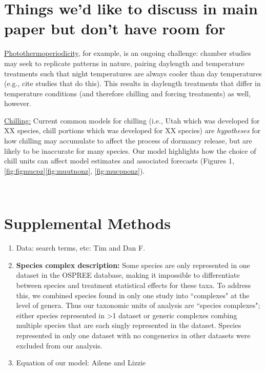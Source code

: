 \documentclass{article}
\begin{document}
\section*{Things we'd like to discuss in main paper but don't have room for}

\par \underline{Photothermoperiodicity}, for example, is an ongoing challenge: chamber studies may seek to replicate patterns in nature, pairing daylength and temperature treatments such that night temperatures are always cooler than day temperatures (e.g., cite studies that do this).  This results in daylength treatments that differ in temperature conditions (and therefore chilling and forcing treatments) as well, however.  

\par \underline{Chilling:} Current common models for chilling (i.e., Utah which was developed for XX species,  chill portions which was developed for XX species) are \emph{hypotheses} for how chilling may accumulate to affect the process of dormancy release, but are likely to be inaccurate for many species. Our model highlights how the choice of chill units can affect model estimates and associated forecasts (Figures 1,\ref{fig:figmucpz}\ref{fig:muutnonz}, \ref{fig:mucpnonz}). 

\
\section*{Supplemental Methods}

\begin{enumerate}
\item Data: search terms, etc: Tim and Dan F.

\item \textbf{Species complex description:} Some species are only represented in one dataset in the OSPREE database, making it impossible to differentiate between species and treatment statistical effects for these taxa. To address this, we combined species found in only one study into ``complexes" at the level of genera. Thus our taxonomic units of analysis are ``species complexes"; either species represented in >1 dataset or generic complexes combing multiple species that are each singly represented in the dataset. Species represented in only one dataset with no congenerics in other datasets were excluded from our analysis.\\


\item Equation of our model: Ailene and Lizzie 
\end{enumerate}
\end{document}
